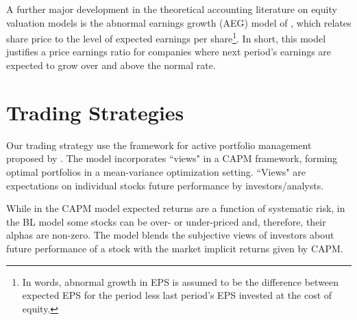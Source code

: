 \documentclass{book}
\newcommand{\tr}{\textit{true}}
\newcommand{\naive}{\textit{recent}}
\newcommand{\default}{\textit{all-time}}
\begin{document}
A further major development in the theoretical accounting literature on equity valuation models is the abnormal earnings growth (AEG) model of \cite{ohlson2005}, which relates share price to the level of expected earnings per share\footnote{In words, abnormal growth in EPS is assumed to be the difference between expected EPS for the period less last period’s EPS invested at the cost of equity.}. In short, this model justifies a price earnings ratio for companies where next period’s earnings are expected to grow over and above the normal rate.








\section{Trading Strategies}
\label{sec:trading}
Our trading strategy use the framework for  active portfolio management proposed by \cite{black1992}.  The model incorporates ``views" in a CAPM framework, forming optimal portfolios in a mean-variance optimization setting. ``Views" are expectations on individual stocks future performance by investors/analysts. 

While in the CAPM model expected returns are a function of systematic risk, in the BL model some stocks can be over- or under-priced and, therefore, their alphas are non-zero. The model blends the subjective views of investors about future performance of a stock with the market implicit returns given by CAPM.
\end{document}
